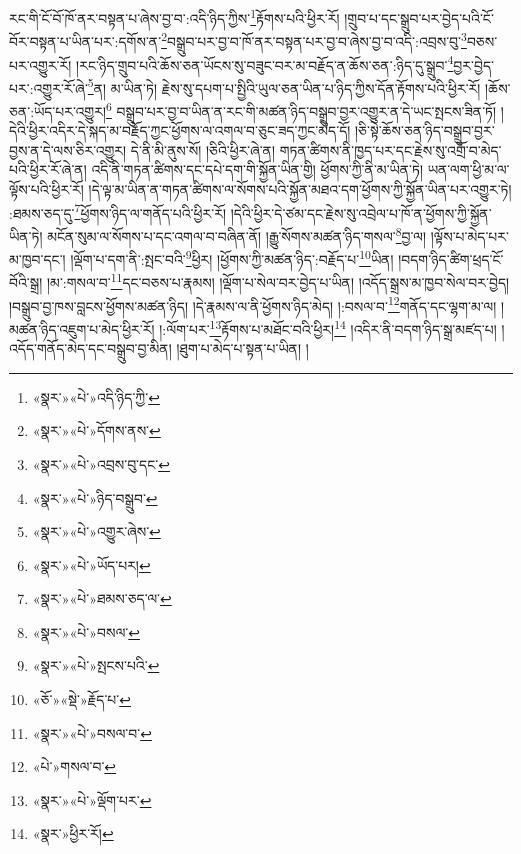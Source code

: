 རང་གི་ངོ་བོ་ཁོ་ནར་བསྟན་པ་ཞེས་བྱ་བ་:འདི་ཉིད་ཀྱིས་\footnote{«སྣར་»«པེ་»འདི་ཉིད་ཀྱི་}རྟོགས་པའི་ཕྱིར་རོ། །གྲུབ་པ་དང་སྒྲུབ་པར་བྱེད་པའི་ངོ་བོར་བསྟན་པ་ཡིན་པར་:དགོས་ན་\footnote{«སྣར་»«པེ་»དོགས་ནས་}བསྒྲུབ་པར་བྱ་བ་ཁོ་ནར་བསྟན་པར་བྱ་བ་ཞེས་བྱ་བ་འདི་:འབྲས་བུ་\footnote{«སྣར་»«པེ་»འབྲས་བུ་དང་}བཅས་པར་འགྱུར་རོ། །རང་ཉིད་གྲུབ་པའི་ཆོས་ཅན་ཡོངས་སུ་བཟུང་བར་མ་བརྗོད་ན་ཆོས་ཅན་:ཉིད་དུ་སྒྲུབ་\footnote{«སྣར་»«པེ་»ཉིད་བསྒྲུབ་}བྱར་བྱེད་པར་:འགྱུར་རོ་ཞེ་\footnote{«སྣར་»«པེ་»འགྱུར་ཞེས་}ན། མ་ཡིན་ཏེ། རྗེས་སུ་དཔག་པ་སྤྱིའི་ཡུལ་ཅན་ཡིན་པ་ཉིད་ཀྱིས་དོན་རྟོགས་པའི་ཕྱིར་རོ། །ཆོས་ཅན་:ཡོད་པར་འགྱུར།\footnote{«སྣར་»«པེ་»ཡོད་པར།} བསྒྲུབ་པར་བྱ་བ་ཡིན་ན་རང་གི་མཚན་ཉིད་བསྒྲུབ་བྱར་འགྱུར་ན་དེ་ཡང་སྤངས་ཟིན་ཏོ། །དེའི་ཕྱིར་འདིར་དེ་སྐད་མ་བརྗོད་ཀྱང་ཕྱོགས་ལ་འགལ་བ་ཅུང་ཟད་ཀྱང་མེད་དོ། །ཅི་སྟེ་ཆོས་ཅན་ཉིད་བསྒྲུབ་བྱར་བྱས་ན་དེ་ལས་ཅིར་འགྱུར། དེ་ནི་མི་ནུས་སོ། །ཅིའི་ཕྱིར་ཞེ་ན། གཏན་ཚིགས་ནི་ཁྱད་པར་དང་རྗེས་སུ་འགྲོ་བ་མེད་པའི་ཕྱིར་རོ་ཞེ་ན། འདི་ནི་གཏན་ཚིགས་དང་དཔེ་དག་གི་སྐྱོན་ཡིན་གྱི། ཕྱོགས་ཀྱི་ནི་མ་ཡིན་ཏེ། ཡན་ལག་ཕྱི་མ་ལ་ལྟོས་པའི་ཕྱིར་རོ། །དེ་ལྟ་མ་ཡིན་ན་གཏན་ཚིགས་ལ་སོགས་པའི་སྐྱོན་མཐའ་དག་ཕྱོགས་ཀྱི་སྐྱོན་ཡིན་པར་འགྱུར་ཏེ། :ཐམས་ཅད་དུ་\footnote{«སྣར་»«པེ་»ཐམས་ཅད་ལ་}ཕྱོགས་ཉིད་ལ་གནོད་པའི་ཕྱིར་རོ། །དེའི་ཕྱིར་དེ་ཙམ་དང་རྗེས་སུ་འབྲེལ་པ་ཁོ་ན་ཕྱོགས་ཀྱི་སྐྱོན་ཡིན་ཏེ། མངོན་སུམ་ལ་སོགས་པ་དང་འགལ་བ་བཞིན་ནོ། །རྒྱུ་སོགས་མཚན་ཉིད་གསལ་\footnote{«སྣར་»«པེ་»བསལ་}བྱ་ལ། །ལྟོས་པ་མེད་པར་མ་ཁྱབ་དང་། །ལྡོག་པ་དག་ནི་:སྤང་བའི་\footnote{«སྣར་»«པེ་»སྤངས་པའི་}ཕྱིར། །ཕྱོགས་ཀྱི་མཚན་ཉིད་:བརྗོད་པ་\footnote{«ཅོ་»«སྡེ་»རྗོད་པ་}ཡིན། །བདག་ཉིད་ཚིག་ཕྲད་ངོ་བོའི་སྒྲ། །མ་:གསལ་བ་\footnote{«སྣར་»«པེ་»བསལ་བ་}དང་བཅས་པ་རྣམས། །ལྡོག་པ་སེལ་བར་བྱེད་པ་ཡིན། །འདོད་སྒྲས་མ་ཁྱབ་སེལ་བར་བྱེད། །བསྒྲུབ་བྱ་ཁས་བླངས་ཕྱོགས་མཚན་ཉིད། །དེ་རྣམས་ལ་ནི་ཕྱོགས་ཉིད་མེད། །:བསལ་བ་\footnote{«པེ་»གསལ་བ་}གནོད་དང་ལྷག་མ་ལ། །མཚན་ཉིད་འཇུག་པ་མེད་ཕྱིར་རོ། །:ལོག་པར་\footnote{«སྣར་»«པེ་»ལྡོག་པར་}རྟོགས་པ་མཐོང་བའི་ཕྱིར།\footnote{«སྣར་»ཕྱིར་རོ།} །འདིར་ནི་བདག་ཉིད་སྒྲ་མཛད་པ། །འདོད་གནོད་མེད་དང་བསྒྲུབ་བྱ་མིན། །ཐུག་པ་མེད་པ་སྟན་པ་ཡིན། །
